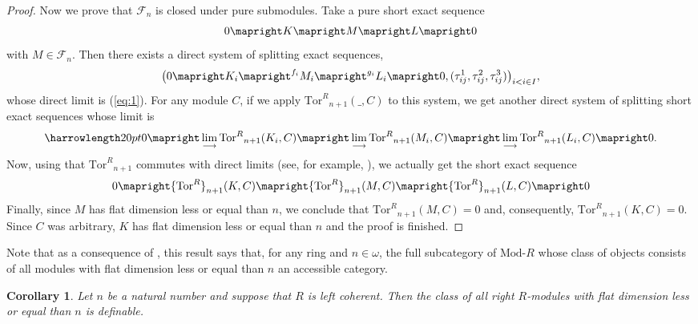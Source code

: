 \documentclass[a4paper,10pt]{amsart}
\newtheorem{corollary}[definition]{Corollary}
\begin{document}
\begin{proof}
  Now we prove that $\mathcal F_n$ is closed under pure submodules. Take
  a pure short exact sequence
  \begin{equation}\label{eq:1}
    0 \mapright K \mapright M \mapright L \mapright 0
  \end{equation}
  with $M \in \mathcal F_{n}$. Then there exists a direct system
  of splitting exact sequences,
  \begin{displaymath}
    \big(0 \mapright K_i \mapright^{f_i} M_i \mapright^{g_i} L_i
    \mapright 0, (\tau^1_{ij}, \tau^2_{ij},
    \tau^3_{ij})\big)_{i < i \in I},
  \end{displaymath}
  whose direct limit is (\ref{eq:1}). For any module $C$, if we apply
  ${\textrm{Tor}^R}_{n+1}(\_,C)$ to this system, we get another direct system of
  splitting short exact sequences whose limit is 
  \begin{displaymath}
    \setlength{\harrowlength}{20pt}
    0 \mapright \lim_{\longrightarrow}{\textrm{Tor}^R}_{n+1}(K_i,C) \mapright
    \lim_{\longrightarrow}{\textrm{Tor}^R}_{n+1}(M_i,C) \mapright \lim_{\longrightarrow}{\textrm{Tor}^R}_{n+1}(L_i,C) \mapright 0.
  \end{displaymath}
  Now, using that ${\textrm{Tor}^R}_{n+1}$ commutes with direct limits (see, for
  example, \cite[Proposition 7.8]{Rotman}), we actually get the short
  exact sequence
  \begin{displaymath}
    0 \mapright {\textrm{Tor}^R}_{n+1}(K,C) \mapright {\textrm{Tor}^R}_{n+1}(M,C) \mapright
    {\textrm{Tor}^R}_{n+1}(L,C) \mapright 0
  \end{displaymath}
  Finally, since $M$ has flat dimension less or equal than $n$, we
  conclude that ${\textrm{Tor}^R}_{n+1}(M,C) = 0$ and, consequently,
  ${\textrm{Tor}^R}_{n+1}(K,C) = 0$. Since $C$
  was arbitrary, $K$ has flat dimension less
  or equal than $n$ and the proof is finished.
\end{proof}

Note that as a consequence of \cite[Corollary 2.36]{AdamekRosicky},
this result says that, for any ring and $n \in \omega$, the full
subcategory of ${\textrm{Mod-}R}$ whose class of objects consists of all modules
with flat dimension less or equal than $n$ an accessible category.

\begin{corollary}\label{c:Definable}
  Let $n$ be a natural number and suppose that $R$ is left coherent. Then the
  class of all right $R$-modules with flat dimension less or equal
  than $n$ is definable.
\end{corollary}
\end{document}
